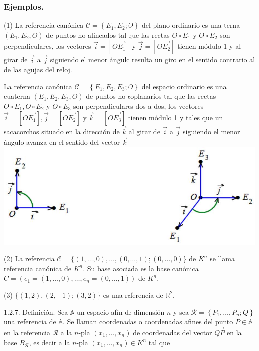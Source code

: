 \documentclass[12pt, a4paper, ones, notitlepage, openany,titlepage]{article}
\begin{document}
\subsubsection{Ejemplos.}
(1) La referencia canónica $\mathcal{C}=\left\{E_{1}, E_{2} ; O\right\}$ del plano ordinario es una terna $\left(E_{1}, E_{2}, O\right)$ de puntos no alineados tal que las rectas $O \circ E_{1}$ y $O \circ E_{2}$ son perpendiculares, los vectores $\vec{i}=\left[\overrightarrow{O E_{1}}\right]$ y $\vec{j}=\left[\overrightarrow{O E_{2}}\right]$ tienen módulo 1 y al girar de $\vec{i}$ a $\vec{j}$ siguiendo el menor ángulo resulta un giro en el sentido contrario al de las agujas del reloj.

La referencia canónica $\mathcal{C}=\left\{E_{1}, E_{2}, E_{3} ; O\right\}$ del espacio ordinario es una cuaterna $\left(E_{1}, E_{2}, E_{3}, O\right)$ de puntos no coplanarios tal que las rectas $O \circ E_{1}, O \circ E_{2}$ y $O \circ E_{3}$ son perpendiculares dos a dos, los vectores $\vec{i}=\left[\overrightarrow{O E_{1}}\right], \vec{j}=\left[\overrightarrow{O E_{2}}\right]$ y $\vec{k}=\left[\overrightarrow{O E_{3}}\right]$ tienen módulo 1 y tales que un sacacorchos situado en la dirección de $\vec{k}$ al girar de $\vec{i}$ a $\vec{j}$ siguiendo el menor ángulo avanza en el sentido del vector $\vec{k}$
\includegraphics[max width=\textwidth, center]{2023_03_01_7659aec5e35f9a9b2d3cg-12(1)}

(2) La referencia $\mathcal{C}=\{(1, \ldots, 0), \ldots,(0, \ldots, 1) ;(0, \ldots, 0)\}$ de $K^{n}$ se llama referencia canónica de $K^{n}$. Su base asociada es la base canónica $C=\left(e_{1}=(1, \ldots, 0), \ldots, e_{n}=(0, \ldots, 1)\right)$ de $K^{n}$.

(3) $\{(1,2),(2,-1) ;(3,2)\}$ es una referencia de $\mathbb{R}^{2}$.

1.2.7. Definición. Sea $\mathbb{A}$ un espacio afín de dimensión $n$ y sea $\mathcal{R}=\left\{P_{1}, \ldots, P_{n} ; Q\right\}$ una referencia de $\mathbb{A}$. Se llaman coordenadas o coordenadas afines del punto $P \in \mathbb{A}$ en la referencia $\mathcal{R}$ a la $n$-pla $\left(x_{1}, \ldots, x_{n}\right)$ de coordenadas del vector $\overrightarrow{Q P}$ en la base $B_{\mathcal{R}}$, es decir a la $n$-pla $\left(x_{1}, \ldots, x_{n}\right) \in K^{n}$ tal que
\end{document}
